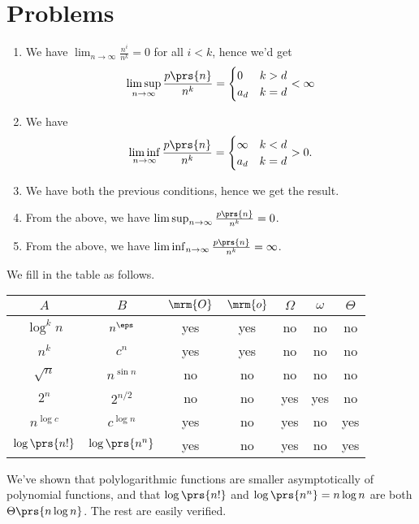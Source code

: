 \documentclass[oneside]{scrbook}
\theoremstyle{definition}
\begin{document}
\section*{Problems}

\begin{problem}
\begin{enumerate}[label = \alph*.]
\item We have $\lim_{n \to \infty} \frac{n^i}{n^k} = 0$ for all $i < k$, hence we'd get
\[\limsup_{n \to \infty} \frac{p\prs{n}}{n^k} =
\begin{cases}
0 & k > d \\
a_d & k = d
\end{cases}
< \infty\]

\item We have \[\liminf_{n \to \infty} \frac{p\prs{n}}{n^k} =
\begin{cases}
\infty & k < d \\
a_d & k = d
\end{cases} > 0 \text{.}\]

\item We have both the previous conditions, hence we get the result.

\item From the above, we have $\limsup_{n \to \infty} \frac{p\prs{n}}{n^k} = 0$.

\item From the above, we have $\liminf_{n \to \infty} \frac{p\prs{n}}{n^k} = \infty$.
\end{enumerate}
\end{problem}

\begin{problem}
We fill in the table as follows.
\begin{center}
\begin{tabular}{c c | c | c | c | c | c |}
$A$ & $B$ & $\mrm{O}$ & $\mrm{o}$ & $\Omega$ & $\omega$ & $\Theta$
\\
\hline
$\log^k n$ & $n^\eps$ & yes & yes & no & no & no \\
\hline
$n^k$ & $c^n$ & yes & yes & no & no & no \\
\hline
$\sqrt{n}$ & $n^{\sin n}$ & no & no & no & no & no \\
\hline
$2^n$ & $2^{n/2}$ & no & no & yes & yes & no \\
\hline
$n^{\log c}$ & $c^{\log n}$ & yes & no & yes & no & yes \\
\hline
$\log\prs{n!}$ & $\log\prs{n^n}$ & yes & no & yes & no & yes \\
\hline
\end{tabular}
\end{center}

We've shown that polylogarithmic functions are smaller asymptotically of polynomial functions, and that $\log\prs{n!}$ and $\log\prs{n^n} = n \log n$ are both $\Theta\prs{n \log n}$. The rest are easily verified.
\end{problem}
\end{document}
